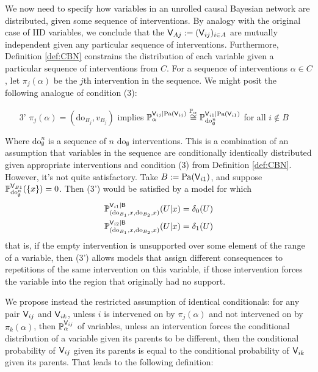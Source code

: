 We now need to specify how variables in an unrolled causal Bayesian network are distributed, given some sequence of interventions. By analogy with the original case of IID variables, we conclude that the $\mathsf{V}_{Aj}:=(\mathsf{V}_{ij})_{i\in A}$ are mutually independent given any particular sequence of interventions. Furthermore, Definition \ref{def:CBN} constrains the distribution of each variable given a particular sequence of interventions from $C$. For a sequence of interventions $\alpha\in C$, let $\pi_j(\alpha)$ be the $j$th intervention in the sequence. We might posit the following analogue of condition (3): 
\begin{itemize}
    \item [3'] $\pi_j(\alpha)=(\mathrm{do}_{B_j},v_{B_j})$ implies $\mathbb{P}_{\alpha}^{\mathsf{V}_{ij}|\mathrm{Pa}(\mathsf{V}_{ij})}\overset{\mathbb{P}_{\alpha}}{\cong}\mathbb{P}_{\mathrm{do}_{\emptyset}^n}^{\mathsf{V}_{i1}|\mathrm{Pa}(\mathsf{V}_{i1})}$ for all $i\not\in B$
\end{itemize}
Where $\mathrm{do}_{\emptyset}^n$ is a sequence of $n$ $\mathrm{do}_{\emptyset}$ interventions. This is a combination of an assumption that variables in the sequence are conditionally identically distributed given appropriate interventions and condition (3) from Definition \ref{def:CBN}. However, it's not quite satisfactory. Take $B:=\mathrm{Pa}(\mathsf{V}_{i1})$, and suppose $\mathbb{P}_{\mathrm{do}_{\emptyset}^n}^{\mathsf{V}_{B1}}(\{x\})=0$. Then (3') would be satisfied by a model for which
\begin{align}
    \mathbb{P}_{(\mathrm{do}_{B_1},x,\mathrm{do}_{B_2},x)}^{\mathsf{V}_{i1}|\mathsf{B}}(U|x) &= \delta_0(U)\\
    \mathbb{P}_{(\mathrm{do}_{B_1},x,\mathrm{do}_{B_2},x)}^{\mathsf{V}_{i2}|\mathsf{B}}(U|x) &= \delta_1(U)
\end{align}
that is, if the empty intervention is unsupported over some element of the range of a variable, then (3') allows models that assign different consequences to repetitions of the same intervention on this variable, if those intervention forces the variable into the region that originally had no support.

We propose instead the restricted assumption of identical conditionals: for any pair $\mathsf{V}_{ij}$ and $\mathsf{V}_{ik}$, unless $i$ is intervened on by $\pi_j(\alpha)$ and not intervened on by $\pi_{k}(\alpha)$, then $\mathbb{P}_\alpha^{\mathsf{V}_{ij}}$ of variables, unless an intervention forces the conditional distribution of a variable given its parents to be different, then the conditional probability of $\mathsf{V}_{ij}$ given its parents is equal to the conditional probability of $\mathsf{V}_{ik}$ given its parents. That leads to the following definition:

